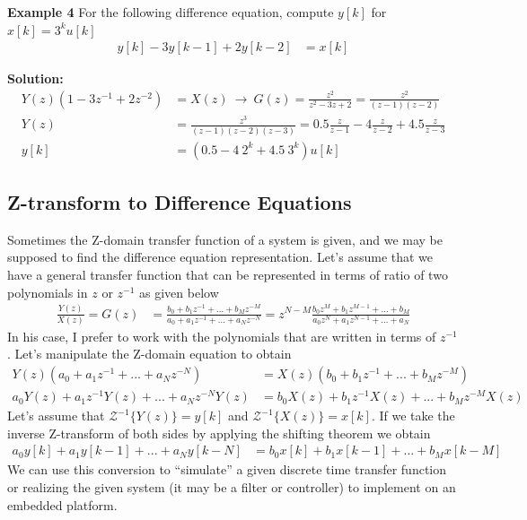 \documentclass[twoside]{article}
\begin{document}
\textbf{Example 4} For the following difference equation, compute
$y[k]$ for $x[k] = 3^k u[k]$
%
\begin{align*}
  y[k] - 3 y[k-1] + 2 y[k-2] &= x[k]
\end{align*}

\textbf{Solution:}
%
\begin{align*}
 Y(z) (1 - 3 z^{-1} + 2 z^{-2}) &= X(z) \ \rightarrow \ G(z) =
  \frac{z^2}{z^2 - 3 z + 2 } = \frac{z^2}{(z-1)(z-2)}
\\
Y(z) &= \frac{z^3}{(z-1)(z-2)(z-3)} = 0.5 \frac{z}{z-1} - 4 \frac{z}{z-2} +
     4.5  \frac{z}{z-3}   
\\
y[k] &= \left( 0.5 - 4 \ 2^k + 4.5 \ 3^k \right) u[k]
\end{align*}

\subsection*{Z-transform to Difference Equations}

Sometimes the Z-domain transfer function of a system is given, and 
we may be supposed to find the difference equation representation. 
Let's assume that we have a general transfer function that can be
represented in terms of ratio of two polynomials in $z$ or $z^{-1}$
as given below
%
\begin{align*}
\frac{Y(z)}{X(z)} = G(z) &= 
\frac{b_0 + b_{1} z^{-1} + ... + b_M z^{-M}}{a_0 + a_{1} z^{-1} + ... + a_N z^{-N}} = 
z^{N-M} 
\frac{b_0 z^{M} + b_{1} z^{M-1} + ... + b_M}{a_0 z^{N} + a_{1} z^{N-1} + ... + a_N}
\end{align*}
%
In his case, I prefer to work with the polynomials that are written in
terms of $z^{-1}$. Let's manipulate the Z-domain equation to obtain
%
\begin{align*}
Y(z) ( a_0 + a_{1} z^{-1} + ... + a_N z^{-N} ) &= X(z) ( b_0 + b_{1}
  z^{-1} + ... + b_M z^{-M} )
\\
a_0 Y(z) + a_{1} z^{-1} Y(z) + ... + a_N z^{-N} Y(z) &= b_0 X(z) + b_{1}
  z^{-1} X(z) + ... + b_M z^{-M} X(z)
\end{align*}
%
Let's assume that $\mathcal{Z}^{-1} \lbrace Y(z) \rbrace = y[k]$ 
and $\mathcal{Z}^{-1} \lbrace X(z) \rbrace = x[k]$. If we take the 
inverse Z-transform of both sides by applying the shifting theorem
we obtain
%
\begin{align*}
a_0 y[k] + a_{1} y[k-1] + ... + a_N y[k-N] &= b_0 x[k] + b_{1}
x[k-1] + ... + b_M x[k-M]
\end{align*}
%
We can use this conversion to ``simulate'' a given discrete time transfer
function or realizing the given system (it may be a filter or
controller) to implement on an embedded platform.  
\end{document}
